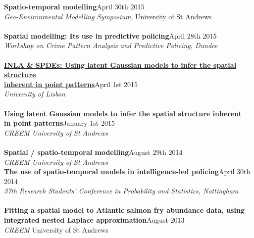 \documentclass[10pt,letter]{res}
\begin{document}
\begin{resume}
 {\textbf{Spatio-temporal modelling}}\hfill April 30th 2015\\
 {\sl Geo-Environmental Modelling Symposium}, University of St Andrews\\
 \hdashrule[0.5ex]{4cm}{1pt}{1pt}\\
{\textbf{Spatial modelling: Its use in predictive policing}}\hfill April 28th 2015\\
 {\sl Workshop on Crime Pattern Analysis and Predictive Policing, Dundee}\\
 \hdashrule[0.5ex]{4cm}{1pt}{1pt}\\
\href{https://drive.google.com/file/d/0B03uSZ5TT4NYanE4N2N6THMtZ28/view?usp=sharing} {\textbf{INLA \& SPDEs: Using latent Gaussian models to infer the spatial structure \\
inherent in point patterns}}\hfill April 1st 2015\\
 {\sl University of Lisbon}\\
 \hdashrule[0.5ex]{4cm}{1pt}{1pt}\\
 {\textbf{Using latent Gaussian models to infer the spatial
structure inherent \\in point patterns}}\hfill January 1st 2015\\
 {\sl CREEM University of St Andrews}\\
 \hdashrule[0.5ex]{4cm}{1pt}{1pt}\\
 {\textbf{Spatial / spatio-temporal modelling}}\hfill August 29th 2014\\
 {\sl CREEM University of St Andrews}\\
 \newpage
{\textbf{The use of spatio-temporal models in intelligence-led policing}}\hfill  April 30th 2014\\
 {\sl 37th Research Students' Conference in Probability and Statistics, Nottingham}\\
 \hdashrule[0.5ex]{4cm}{1pt}{1pt}\\
{\textbf{Fitting a spatial model to Atlantic salmon fry abundance data, using\\ integrated nested Laplace approximation}}\hfill  August 2013\\
 {\sl CREEM} University of St Andrews\\ 


\end{resume}
\end{document}
